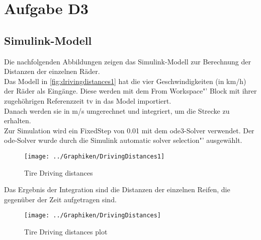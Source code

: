 
\chapter{Aufgabe D3}

\section{Simulink-Modell}
Die nachfolgenden Abbildungen zeigen das Simulink-Modell zur Berechnung der Distanzen der einzelnen Räder.\\
Das Modell in \autoref{fig:drivingdistances1} hat die vier Geschwindigkeiten (in km/h) der Räder als Eingänge. Diese werden mit dem \glqq From Workspace"' Block mit ihrer zugehöhrigen Referenzzeit tv in das Model importiert.\\
Danach werden sie in m/s umgerechnet und integriert, um die Strecke zu erhalten. \\
Zur Simulation wird ein FixedStep von 0.01 mit dem ode3-Solver verwendet. Der ode-Solver wurde durch die Simulink \glqq automatic solver selection"' ausgewählt.
\begin{figure}[h!]
	\centering
	\texttt{[image: ../Graphiken/DrivingDistances1]}
	\caption{Tire Driving distances}
	\label{fig:drivingdistances1}
\end{figure}
Das Ergebnis der Integration sind die Distanzen der einzelnen Reifen, die gegenüber der Zeit aufgetragen sind.\newpage
\begin{figure}[h!]
	\centering
	\texttt{[image: ../Graphiken/DrivingDistances]}
	\caption{Tire Driving distances plot}
	\label{fig:drivingdistances}
\end{figure}




	
	

	
	
	
	